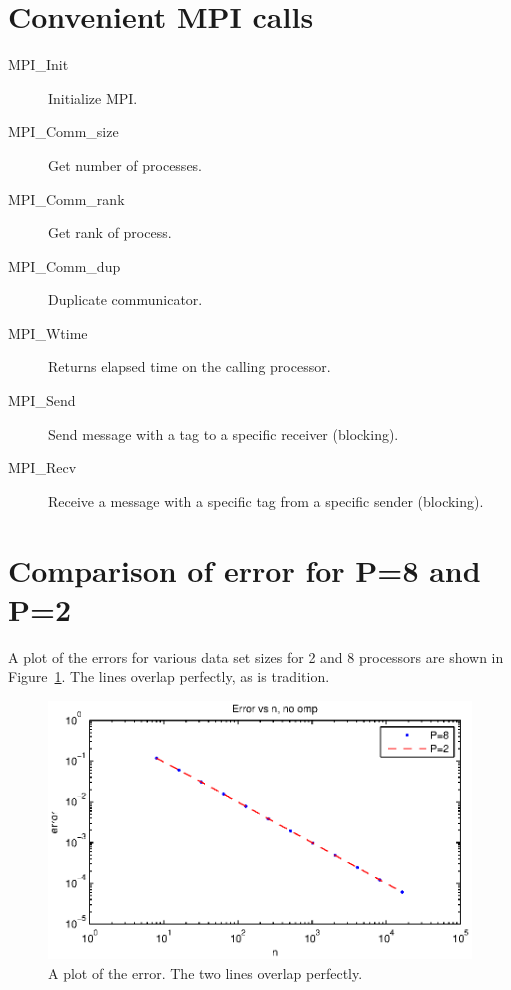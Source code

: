 \clearpage
\section{Convenient MPI calls} %
\label{sec:convenient_mpi_calls}
\begin{description}
  \item[MPI\_Init] Initialize MPI.
  \item[MPI\_Comm\_size] Get number of processes.
  \item[MPI\_Comm\_rank] Get rank of process.
  \item[MPI\_Comm\_dup] Duplicate communicator.
  \item[MPI\_Wtime] Returns elapsed time on the calling processor.
  \item[MPI\_Send] Send message with a tag to a specific receiver (blocking).
  \item[MPI\_Recv] Receive a message with a specific tag from a specific sender (blocking).
\end{description}


\section{Comparison of error for P=8 and P=2} %
\label{sec:comparison_of_error_for_p_8_and_p_2}
A plot of the errors for various data set sizes for 2 and 8 processors are shown in Figure~\ref{fig:error}. The lines overlap perfectly, as is tradition.

\begin{figure}[htbp]
  \centering
  \includegraphics[]{graphics/error.eps}
  \caption{A plot of the error. The two lines overlap perfectly.}
  \label{fig:error}
\end{figure}


